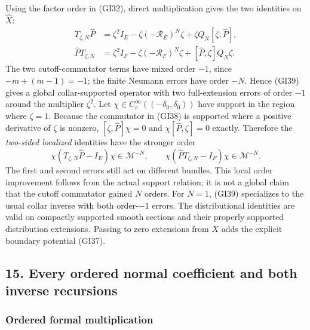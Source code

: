 \documentclass[
  11pt,
]{article}
\makeatletter
\let\ReaderOriginalAnchorStart\hyper@anchorstart
\let\ReaderOriginalAnchorEnd\hyper@anchorend
\let\ReaderPendingAliases\@empty
\def\ReaderArmAliases#1{\gdef\ReaderPendingAliases{#1}}
\def\hyper@anchorstart#1{\ReaderIfNativeAnchorTF{#1}{\ReaderPendingAliases\global\let\ReaderPendingAliases\@empty}{}\ReaderOriginalAnchorStart{#1}}
\makeatother
\begin{document}
Using the factor order in (GI32), direct multiplication gives the two
identities on \(\widehat X\): \[
 \begin{aligned}
 T_{\zeta,N}\widehat P
 &=\zeta^2I_E-\zeta(-\mathcal R_E)^N\zeta
   +\zeta Q_N[\zeta,\widehat P],\\
 \widehat P T_{\zeta,N}
 &=\zeta^2I_F-\zeta(-\mathcal R_F)^N\zeta
   +[\widehat P,\zeta]Q_N\zeta.
 \end{aligned}
 \tag{GI39}
\] The two cutoff-commutator terms have mixed order \(-1\), since
\(-m+(m-1)=-1\); the finite Neumann errors have order \(-N\). Hence
(GI39) gives a global collar-supported operator with two full-extension
errors of order \(-1\) around the multiplier \(\zeta^2\). Let
\(\chi\in C_c^\infty((-\delta_0,\delta_0))\) have support in the region
where \(\zeta=1\). Because the commutator in (GI38) is supported where a
positive derivative of \(\zeta\) is nonzero,
\([\zeta,\widehat P]\chi=0\) and \(\chi[\widehat P,\zeta]=0\) exactly.
Therefore the \emph{two-sided localized} identities have the stronger
order \[
 \chi(T_{\zeta,N}\widehat P-I_E)\chi\in\mathscr M^{-N},
 \qquad
 \chi(\widehat P T_{\zeta,N}-I_F)\chi\in\mathscr M^{-N}.
 \tag{GI40}
\] The first and second errors still act on different bundles. This
local order improvement follows from the actual support relation; it is
not a global claim that the cutoff commutator gained \(N\) orders. For
\(N=1\), (GI39) specializes to the usual collar inverse with both
order-\(-1\) errors. The distributional identities are valid on
compactly supported smooth sections and their properly supported
distribution extensions. Passing to zero extensions from \(X\) adds the
explicit boundary potential (GI37).

\ReaderArmAliases{\ReaderOriginalAnchorStart{AN03-GCF-FOUNDATION-015}\ReaderOriginalAnchorEnd\begingroup\expandafter\def\csname @currentHref\endcsname{AN03-GCF-FOUNDATION-015}\label{AN03-GCF-FOUNDATION-015}\endgroup\ReaderOriginalAnchorStart{boundary-foundation-15}\ReaderOriginalAnchorEnd}
\subsection{15. Every ordered normal coefficient and both inverse
recursions}\label{boundary-foundation-15}

\subsubsection{Ordered formal
multiplication}\label{ordered-formal-multiplication}
\end{document}

